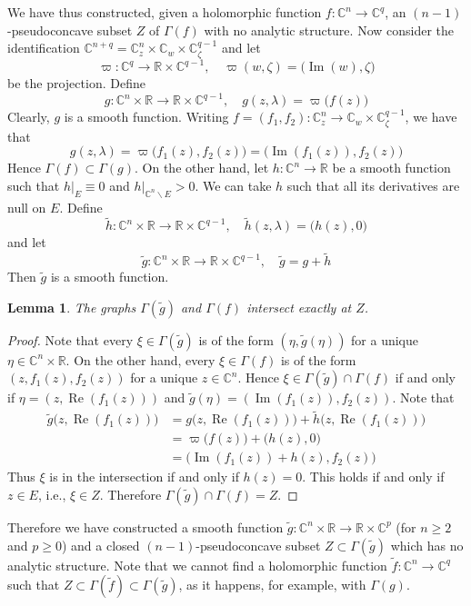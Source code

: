 \documentclass[reqno,oneside]{amsart}
\newcommand{\numberset}{\mathbb}
\newcommand{\R}{\numberset{R}}
\newcommand{\C}{\numberset{C}}
\DeclareMathOperator{\Realpart}{Re}
\renewcommand{\Re}{\Realpart}
\DeclareMathOperator{\Impart}{Im}
\renewcommand{\Im}{\Impart}
\theoremstyle{definition}
\theoremstyle{plain}
\newtheorem{lemma}[definition]{Lemma}
\theoremstyle{remark}
\begin{document}
We have thus constructed, given a holomorphic function $f:\C^n\to\C^q$, an $(n-1)$-pseudoconcave subset $Z$ of $\Gamma(f)$ with no analytic structure. Now consider the identification $\C^{n+q}=\C^n_z\times\C_w\times\C^{q-1}_\zeta$ and let
\[
	\varpi:\C^q\to\R\times\C^{q-1}, \quad \varpi(w,\zeta)=\bigl(\Im(w),\zeta\bigr)
\]
be the projection. Define
\[
	g:\C^n\times\R\to\R\times\C^{q-1}, \quad g(z,\lambda)=\varpi\bigl(f(z)\bigr)
\]
Clearly, $g$ is a smooth function. Writing $f=(f_1,f_2):\C^n_z\to\C_w\times\C^{q-1}_\zeta$, we have that
\[
	g(z,\lambda)=\varpi\bigl(f_1(z),f_2(z)\bigr)=\bigl(\Im(f_1(z)),f_2(z)\bigr)
\]
Hence $\Gamma(f)\subset\Gamma(g)$. On the other hand, let $h:\C^n\to\R$ be a smooth function such that $h|_E\equiv 0$ and $h|_{\C^n\smallsetminus E}>0$. We can take $h$ such that all its derivatives are null on $E$. Define
\[
	\tilde{h}:\C^n\times\R\to\R\times\C^{q-1}, \quad \tilde{h}(z,\lambda)=\bigl(h(z),0\bigr)
\]
and let
\[
	\tilde{g}:\C^n\times\R\to\R\times\C^{q-1}, \quad \tilde{g}=g+\tilde{h}
\]
Then $\tilde{g}$ is a smooth function.
\begin{lemma}
	The graphs $\Gamma(\tilde{g})$ and $\Gamma(f)$ intersect exactly at $Z$.
\end{lemma}
\begin{proof}
	Note that every $\xi\in\Gamma(\tilde{g})$ is of the form $(\eta,\tilde{g}(\eta))$ for a unique $\eta\in\C^n\times\R$. On the other hand, every $\xi\in\Gamma(f)$ is of the form $(z,f_1(z),f_2(z))$ for a unique $z\in\C^n$. Hence $\xi\in\Gamma(\tilde{g})\cap\Gamma(f)$ if and only if $\eta=(z,\Re(f_1(z)))$ and $\tilde{g}(\eta)=(\Im(f_1(z)),f_2(z))$. Note that
	\begin{align*}
		\tilde{g}\bigl(z,\Re(f_1(z))\bigr) &= g\bigl(z,\Re(f_1(z))\bigr)+\tilde{h}\bigl(z,\Re(f_1(z))\bigr) \\
		&= \varpi\bigl(f(z)\bigr)+\bigl(h(z),0\bigr) \\
		&= \bigl(\Im(f_1(z))+h(z),f_2(z)\bigr)
	\end{align*}
	Thus $\xi$ is in the intersection if and only if $h(z)=0$. This holds if and only if $z\in E$, i.e., $\xi\in Z$. Therefore $\Gamma(\tilde{g})\cap\Gamma(f)=Z$.
\end{proof}

Therefore we have constructed a smooth function $\tilde{g}:\C^n\times\R\to\R\times\C^p$ (for $n\geq 2$ and $p\geq 0$) and a closed $(n-1)$-pseudoconcave subset $Z\subset\Gamma(\tilde{g})$ which has no analytic structure. Note that we cannot find a holomorphic function $\tilde{f}:\C^n\to\C^q$ such that $Z\subset\Gamma(\tilde{f})\subset\Gamma(\tilde{g})$, as it happens, for example, with $\Gamma(g)$.
\end{document}
